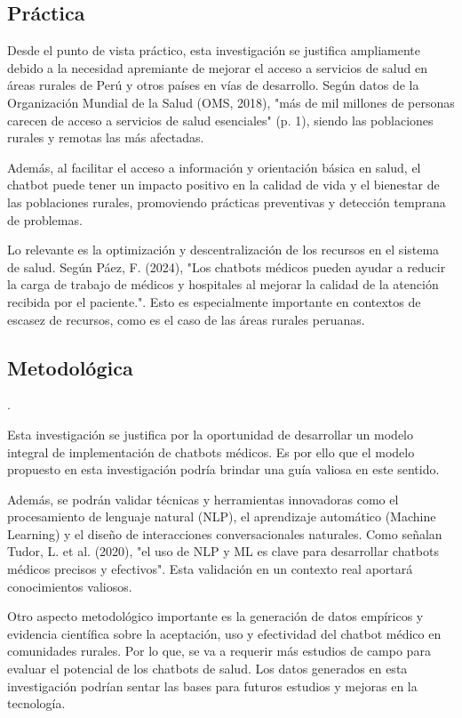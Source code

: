 \subsection{Práctica}
Desde el punto de vista práctico, esta investigación se justifica ampliamente debido a la necesidad apremiante de mejorar el acceso a servicios de salud en áreas rurales de Perú y otros países en vías de desarrollo. Según datos de la Organización Mundial de la Salud (OMS, 2018), "más de mil millones de personas carecen de acceso a servicios de salud esenciales" (p. 1), siendo las poblaciones rurales y remotas las más afectadas.

Además, al facilitar el acceso a información y orientación básica en salud, el chatbot puede tener un impacto positivo en la calidad de vida y el bienestar de las poblaciones rurales, promoviendo prácticas preventivas y detección temprana de problemas.

Lo relevante es la optimización y descentralización de los recursos en el sistema de salud. Según Páez, F. (2024), "Los chatbots médicos pueden ayudar a reducir la carga de trabajo de médicos y hospitales al mejorar la calidad de la atención recibida por el paciente.". Esto es especialmente importante en contextos de escasez de recursos, como es el caso de las áreas rurales peruanas.

\subsection{Metodológica}. 

Esta investigación se justifica por la oportunidad de desarrollar un modelo integral de implementación de chatbots médicos. Es por ello que el modelo propuesto en esta investigación podría brindar una guía valiosa en este sentido.

Además, se podrán validar técnicas y herramientas innovadoras como el procesamiento de lenguaje natural (NLP), el aprendizaje automático (Machine Learning) y el diseño de interacciones conversacionales naturales. Como señalan Tudor, L. et al. (2020), "el uso de NLP y ML es clave para desarrollar chatbots médicos precisos y efectivos". Esta validación en un contexto real aportará conocimientos valiosos.

Otro aspecto metodológico importante es la generación de datos empíricos y evidencia científica sobre la aceptación, uso y efectividad del chatbot médico en comunidades rurales. Por lo que, se va a requerir más estudios de campo para evaluar el potencial de los chatbots de salud. Los datos generados en esta investigación podrían sentar las bases para futuros estudios y mejoras en la tecnología.

